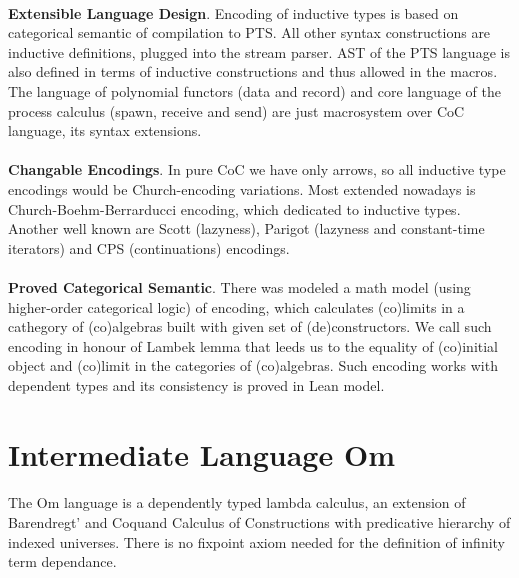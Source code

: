 \documentclass[11pt,oneside]{article}
\begin{document}
\paragraph{}
{\bf Extensible Language Design}. Encoding of inductive types is based on categorical
semantic of compilation to PTS. All other syntax constructions are inductive
definitions, plugged into the stream parser. AST of the PTS language is also
defined in terms of inductive constructions and thus allowed in the macros.
The language of polynomial functors (data and record) and core language of
the process calculus (spawn, receive and send) are just macrosystem over CoC language,
its syntax extensions.

\paragraph{}
{\bf Changable Encodings}. In pure CoC we have only arrows, so all inductive type encodings would
be Church-encoding variations. Most extended nowadays is Church-Boehm-Berrarducci encoding,
which dedicated to inductive types. Another well known are Scott (lazyness),
Parigot (lazyness and constant-time iterators) and CPS (continuations) encodings.

\paragraph{}
{\bf Proved Categorical Semantic}. There was modeled a math model (using
higher-order categorical logic) of encoding, which calculates (co)limits in a
cathegory of (co)algebras built with given set of (de)constructors.
We call such encoding in honour of Lambek lemma that leeds us to the
equality of (co)initial object and (co)limit in the categories of (co)algebras.
Such encoding works with dependent types and its consistency is proved in Lean model.

\newpage
\section{Intermediate Language Om}

   \paragraph{}
   The Om language is a dependently typed lambda calculus, an extension of Barendregt'
   and Coquand Calculus of Constructions with predicative hierarchy of indexed universes.
   There is no fixpoint axiom needed for the definition of infinity term dependance.
\end{document}
